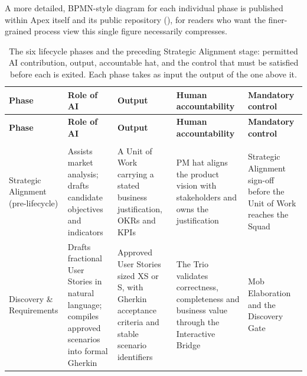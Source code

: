 A more detailed, BPMN-style diagram for each individual phase is published within Apex itself and its public repository (), for readers who want the finer-grained process view this single figure necessarily compresses.

{\scriptsize
\renewcommand{\arraystretch}{1.3}
\setlength{\tabcolsep}{4pt}
\begin{longtable}{>{\raggedright\arraybackslash}p{1.95cm}
                  >{\raggedright\arraybackslash}p{3.25cm}
                  >{\raggedright\arraybackslash}p{2.85cm}
                  >{\raggedright\arraybackslash}p{3.25cm}
                  >{\raggedright\arraybackslash}p{3.2cm}}
\caption[The six lifecycle phases and the preceding Strategic Alignment stage]{The six lifecycle phases and the preceding Strategic Alignment stage: permitted AI contribution, output, accountable hat, and the control that must be satisfied before each is exited. Each phase takes as input the output of the one above it.}
\label{tab:phase_mapping} \\

\toprule
\textbf{Phase} & \textbf{Role of AI} & \textbf{Output} & \textbf{Human accountability} & \textbf{Mandatory control} \\
\midrule
\endfirsthead

\toprule
\textbf{Phase} & \textbf{Role of AI} & \textbf{Output} & \textbf{Human accountability} & \textbf{Mandatory control} \\
\midrule
\endhead

\midrule
\multicolumn{5}{r}{\textit{Continued on next page}}\\
\bottomrule
\endfoot

\bottomrule
\endlastfoot

Strategic Alignment (pre-lifecycle) &
Assists market analysis; drafts candidate objectives and indicators &
A Unit of Work carrying a stated business justification, \acp{OKR} and \acp{KPI} &
\ac{PM} hat aligns the product vision with stakeholders and owns the justification &
Strategic Alignment sign-off before the Unit of Work reaches the Squad \\
\midrule

Discovery \& Requirements &
Drafts fractional User Stories in natural language; compiles approved scenarios into formal Gherkin &
Approved User Stories sized XS or S, with Gherkin acceptance criteria and stable scenario identifiers &
The Trio validates correctness, completeness and business value through the Interactive Bridge &
Mob Elaboration and the Discovery Gate \\
\midrule


\end{longtable}}
